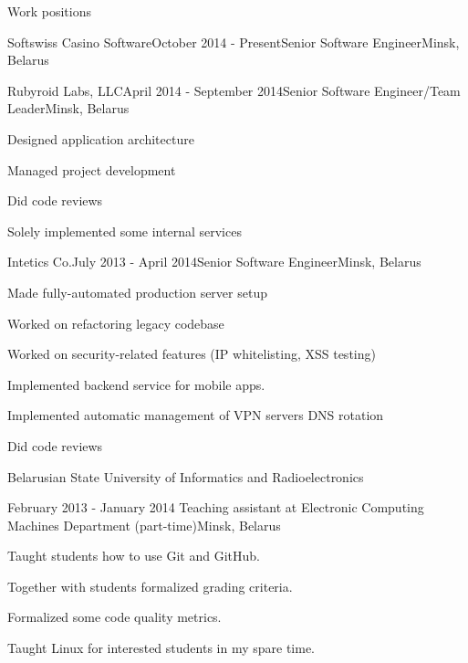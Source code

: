 \documentclass{resume} %
\begin{document}

\begin{rSection}{Work positions}

\begin{rSubsection}{Softswiss Casino Software}{October 2014 - Present}{Senior Software Engineer}{Minsk, Belarus}
~
\end{rSubsection}

\begin{rSubsection}{Rubyroid Labs, LLC}{April 2014 - September 2014}{Senior Software Engineer/Team Leader}{Minsk, Belarus}
\item Designed application architecture
\item Managed project development
\item Did code reviews
\item Solely implemented some internal services
\end{rSubsection}

\begin{rSubsection}{Intetics Co.}{July 2013 - April 2014}{Senior Software Engineer}{Minsk, Belarus}
\item Made fully-automated production server setup
\item Worked on refactoring legacy codebase
\item Worked on security-related features (IP whitelisting, XSS testing)
\item Implemented backend service for mobile apps.
\item Implemented automatic management of VPN servers DNS rotation
\item Did code reviews
\end{rSubsection}

\begin{rSubsection}{\parbox[t][2em][t]{9cm}{Belarusian State University of Informatics and Radioelectronics}}{February 2013 - January 2014 }{Teaching assistant at Electronic Computing Machines Department (part-time)}{Minsk, Belarus}
\item Taught students how to use Git and GitHub.
\item Together with students formalized grading criteria.
\item Formalized some code quality metrics.
\item Taught Linux for interested students in my spare time.
\end{rSubsection}


\end{rSection}
\end{document}

